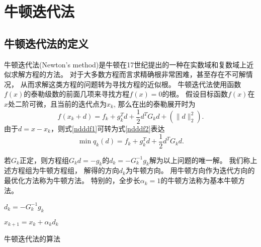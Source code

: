 \section{牛顿迭代法}
\subsection{牛顿迭代法的定义}
    牛顿迭代法(Newton's method)是牛顿在17世纪提出的一种在实数域和复数域上近似求解方程的方法。
    对于大多数方程而言求精确根非常困难，甚至存在不可解情况，
    从而求解这类方程的问题转为寻找方程的近似根。
    牛顿迭代法使用函数$f(x)$的泰勒级数的前面几项来寻找方程$f(x)=0$的根。
    假设目标函数$f(x)$在$x$处二阶可微，且当前的迭代点为$x_k$,
    那么在出的泰勒展开时为
    \begin{equation}\label{ndddf1}
        f(x_k+d) = f_k + g_k^Td+\frac{1}{2}d^TG_kd + (\|d\|_2^2).
    \end{equation}
    由于$d = x - x_k$，则式\eqref{ndddf1}可转为式\eqref{ndddf2}表达
    \begin{equation}\label{ndddf2}
        \mathop{\mathrm{min}} q_k(d) = f_k + g_k^Td+\frac{1}{2}d^TG_kd.
    \end{equation}

    若$G_k$正定，则方程组$G_kd=-g_k$的$d_k=-G_k^{-1}g_k$解为以上问题的唯一解。
    我们称上述方程组为牛顿方程组，
    解得的方向$d_k$为牛顿方向。
    用牛顿方向作为迭代方向的最优化方法称为牛顿方法。
    特别的，全步长$\alpha_k=1$的牛顿方法称为基本牛顿方法。

    
    
    
    
    
    \begin{algorithm}
    
        \SetAlgoLined
    
         {
            $d_k=-G_k^{-1}g_k$
        
            $x_{k+1}=x_k+\alpha_kd_k$
        }
        \caption{牛顿迭代法的算法}
    \end{algorithm}
    
